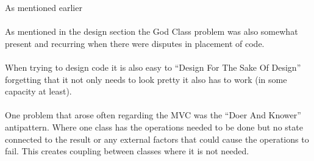 \documentclass[main.tex]{subfiles}
\begin{document}
As mentioned earlier 
\\ \\
As mentioned in the design section the God Class problem was also somewhat present and recurring when there were disputes in placement of code.
\\ \\
When trying to design code it is also easy to “Design For The Sake Of Design” forgetting that it not only needs to look pretty it also has to work (in some capacity at least).
\\ \\
One problem that arose often regarding the MVC was the “Doer And Knower” antipattern. Where one class has the operations needed to be done but no state connected to the result or any external factors that could cause the operations to fail. This creates coupling between classes where it is not needed.
\end{document}
